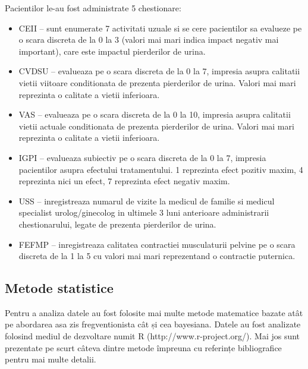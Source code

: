 \documentclass[11pt,draft]{article}
\begin{document}
  Pacientilor le-au fost administrate 5 chestionare:
  \begin{itemize}
    \item \ac{CEII} -- sunt enumerate 7 activitati uzuale si se cere pacientilor sa evalueze pe o scara discreta de la 0 la 3 (valori mai mari indica impact negativ mai important), care este impactul pierderilor de urina.
    \item \ac{CVDSU} -- evalueaza pe o scara discreta de la 0 la 7, impresia asupra calitatii vietii viitoare conditionata de prezenta pierderilor de urina. Valori mai mari reprezinta o calitate a vietii inferioara.
    \item \ac{VAS} -- evalueaza pe o scara discreta de la 0 la 10, impresia asupra calitatii vietii actuale conditionata de prezenta pierderilor de urina. Valori mai mari reprezinta o calitate a vietii inferioara.
    \item \ac{IGPI} -- evalueaza subiectiv pe o scara discreta de la 0 la 7, impresia pacientilor asupra efectului tratamentului. 1 reprezinta efect pozitiv maxim, 4 reprezinta nici un efect, 7 reprezinta efect negativ maxim.
    \item \ac{USS} -- inregistreaza numarul de vizite la medicul de familie si medicul specialist urolog/ginecolog in ultimele 3 luni anterioare administrarii chestionarului, legate de prezenta pierderilor de urina.
    \item \ac{FEFMP} -- inregistreaza  calitatea contractiei musculaturii pelvine pe o scara discreta de la 1 la 5 cu valori mai mari reprezentand o contractie puternica. 
  \end{itemize}

\subsection{Metode statistice}
  Pentru a analiza datele au fost folosite mai multe metode matematice bazate atât pe abordarea asa zis fregventionista cât și cea bayesiana. Datele au fost analizate folosind mediul de dezvoltare numit R (http://www.r-project.org/). Mai jos sunt prezentate pe scurt câteva dintre metode împreuna cu referințe bibliografice pentru mai multe detalii.
\end{document}
